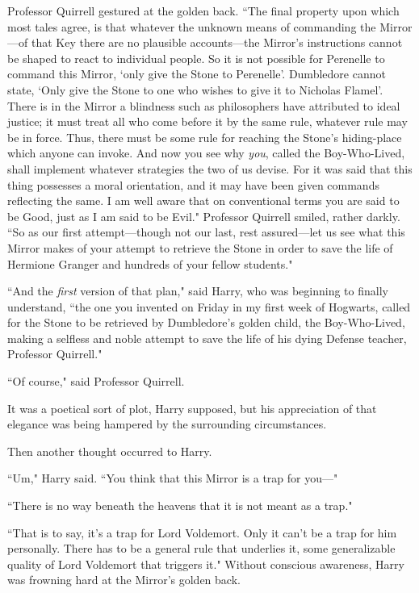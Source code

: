 Professor Quirrell gestured at the golden back. ``The final property upon which most tales agree, is that whatever the unknown means of commanding the Mirror---of that Key there are no plausible accounts---the Mirror's instructions cannot be shaped to react to individual people. So it is not possible for Perenelle to command this Mirror, `only give the Stone to Perenelle'. Dumbledore cannot state, `Only give the Stone to one who wishes to give it to Nicholas Flamel'. There is in the Mirror a blindness such as philosophers have attributed to ideal justice; it must treat all who come before it by the same rule, whatever rule may be in force. Thus, there must be some rule for reaching the Stone's hiding-place which anyone can invoke. And now you see why \emph{you}, called the Boy-Who-Lived, shall implement whatever strategies the two of us devise. For it was said that this thing possesses a moral orientation, and it may have been given commands reflecting the same. I am well aware that on conventional terms you are said to be Good, just as I am said to be Evil." Professor Quirrell smiled, rather darkly. ``So as our first attempt---though not our last, rest assured---let us see what this Mirror makes of your attempt to retrieve the Stone in order to save the life of Hermione Granger and hundreds of your fellow students."

``And the \emph{first} version of that plan," said Harry, who was beginning to finally understand, ``the one you invented on Friday in my first week of Hogwarts, called for the Stone to be retrieved by Dumbledore's golden child, the Boy-Who-Lived, making a selfless and noble attempt to save the life of his dying Defense teacher, Professor Quirrell."

``Of course," said Professor Quirrell.

It was a poetical sort of plot, Harry supposed, but his appreciation of that elegance was being hampered by the surrounding circumstances.

Then another thought occurred to Harry.

``Um," Harry said. ``You think that this Mirror is a trap for you---"

``There is no way beneath the heavens that it is not meant as a trap."

``That is to say, it's a trap for Lord Voldemort. Only it can't be a trap for him personally. There has to be a general rule that underlies it, some generalizable quality of Lord Voldemort that triggers it." Without conscious awareness, Harry was frowning hard at the Mirror's golden back.


